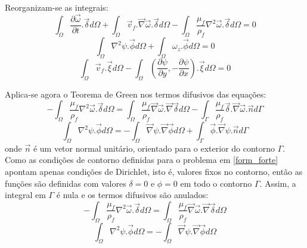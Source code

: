 Reorganizam-se as integrais:
\begin{equation}
    \int_{\Omega}
    \dfrac{\partial \vec{\omega}}{\partial t}
    .\vec{\delta} d\Omega +
    \int_{\Omega}
    \vec{v}_f.\vec{\nabla}\vec{\omega}
    .\vec{\delta} d\Omega -
    \int_{\Omega}
    \dfrac{\mu_f}{\rho_f} \nabla^2 \vec{\omega}
    .\vec{\delta} d\Omega = 0
\end{equation}
\begin{equation}
    \int_{\Omega}
    \nabla^2\psi
    .\vec{\phi} d\Omega +
    \int_{\Omega}
    \omega_z
    .\vec{\phi} d\Omega = 0
\end{equation}
\begin{equation}
    \int_{\Omega}
    \vec{v}_f
    .\vec{\xi} d\Omega -
    \int_{\Omega}
    \left(\dfrac{\partial \psi}{\partial y},
    -\dfrac{\partial \psi}{\partial x} \right)
    .\vec{\xi} d\Omega = 0
\end{equation}

Aplica-se agora o Teorema de Green nos termos difusivos das equações:
\begin{equation}
    -\int_{\Omega}
    \dfrac{\mu_f}{\rho_f} \nabla^2 \vec{\omega}
    .\vec{\delta} d\Omega = 
    \int_{\Omega}
    \dfrac{\mu_f}{\rho_f}
    \vec{\nabla}\vec{\omega}.\vec{\nabla}
    \vec{\delta} d\Omega -
    \int_{\Gamma}
    \dfrac{\mu_f}{\rho_f}
    \vec{\delta}.\vec{\nabla}\vec{\omega}
    .\vec{n} d\Gamma
\end{equation}
\begin{equation}
    \int_{\Omega}
    \nabla^2\psi
    .\vec{\phi} d\Omega = -
    \int_{\Omega}
    \vec{\nabla}\psi.\vec{\nabla}
    \vec{\phi} d\Omega +
    \int_{\Gamma}
    \vec{\phi}.\vec{\nabla}\psi
    .\vec{n} d\Gamma
\end{equation}
onde $\vec{n}$ é um vetor normal unitário, orientado para o exterior do contorno $\Gamma$.
Como as condições de contorno definidas para o problema em \ref{form_forte} apontam apenas condições de Dirichlet, isto é, valores fixos no contorno, então as funções são definidas com valores $\delta=0$ e $\phi=0$ em todo o contorno $\Gamma$.
Assim, a integral em $\Gamma$ é nula e os termos difusivos são anulados:
\begin{equation}
    -\int_{\Omega}
    \dfrac{\mu_f}{\rho_f} \nabla^2 \vec{\omega}
    .\vec{\delta} d\Omega = 
    \int_{\Omega}
    \dfrac{\mu_f}{\rho_f}
    \vec{\nabla}\vec{\omega}.\vec{\nabla}
    \vec{\delta} d\Omega
\end{equation}
\begin{equation}
    \int_{\Omega}
    \nabla^2\psi
    .\vec{\phi} d\Omega = -
    \int_{\Omega}
    \vec{\nabla}\psi.\vec{\nabla}
    \vec{\phi} d\Omega
\end{equation}

